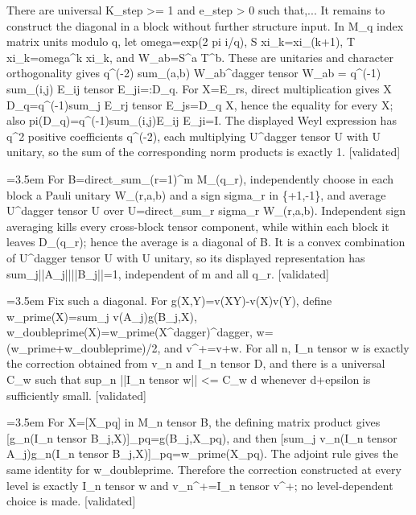 \documentclass{article}
\newcommand{\step}[1]{\par\noindent\hangindent=3.5em\hangafter=1%
  \makebox[3.5em][l]{\textbf{#1.}}}
\newcommand{\steptag}[1]{\hfill{\small\textsf{[#1]}}}
\begin{document}
\begin{proofbox}{There are universal K\_step >= 1 and e\_step > 0 such that,...}
It remains to construct the diagonal in a block without further structure input. In M\_q index matrix units modulo q, let omega=exp(2 pi i/q), S xi\_k=xi\_(k+1), T xi\_k=omega\textasciicircum{}k xi\_k, and W\_ab=S\textasciicircum{}a T\textasciicircum{}b. These are unitaries and character orthogonality gives
q\textasciicircum{}(-2) sum\_(a,b) W\_ab\textasciicircum{}dagger tensor W\_ab = q\textasciicircum{}(-1) sum\_(i,j) E\_ij tensor E\_ji=:D\_q.
For X=E\_rs, direct multiplication gives X D\_q=q\textasciicircum{}(-1)sum\_j E\_rj tensor E\_js=D\_q X, hence the equality for every X; also pi(D\_q)=q\textasciicircum{}(-1)sum\_(i,j)E\_ij E\_ji=I. The displayed Weyl expression has q\textasciicircum{}2 positive coefficients q\textasciicircum{}(-2), each multiplying U\textasciicircum{}dagger tensor U with U unitary, so the sum of the corresponding norm products is exactly 1. \steptag{validated} \\[4pt]
\step{1.1.2} For B=direct\_sum\_(r=1)\textasciicircum{}m M\_(q\_r), independently choose in each block a Pauli unitary W\_(r,a,b) and a sign sigma\_r in \{+1,-1\}, and average U\textasciicircum{}dagger tensor U over U=direct\_sum\_r sigma\_r W\_(r,a,b). Independent sign averaging kills every cross-block tensor component, while within each block it leaves D\_(q\_r); hence the average is a diagonal of B. It is a convex combination of U\textasciicircum{}dagger tensor U with U unitary, so its displayed representation has sum\_j||A\_j||||B\_j||=1, independent of m and all q\_r. \steptag{validated} \\[4pt]
\step{1.2} Fix such a diagonal. For g(X,Y)=v(XY)-v(X)v(Y), define w\_prime(X)=sum\_j v(A\_j)g(B\_j,X), w\_doubleprime(X)=w\_prime(X\textasciicircum{}dagger)\textasciicircum{}dagger, w=(w\_prime+w\_doubleprime)/2, and v\textasciicircum{}+=v+w. For all n, I\_n tensor w is exactly the correction obtained from v\_n and I\_n tensor D, and there is a universal C\_w such that sup\_n ||I\_n tensor w|| <= C\_w d whenever d+epsilon is sufficiently small. \steptag{validated} \\[6pt]
\step{1.2.1} For X=[X\_pq] in M\_n tensor B, the defining matrix product gives [g\_n(I\_n tensor B\_j,X)]\_pq=g(B\_j,X\_pq), and then [sum\_j v\_n(I\_n tensor A\_j)g\_n(I\_n tensor B\_j,X)]\_pq=w\_prime(X\_pq). The adjoint rule gives the same identity for w\_doubleprime. Therefore the correction constructed at every level is exactly I\_n tensor w and v\_n\textasciicircum{}+=I\_n tensor v\textasciicircum{}+; no level-dependent choice is made. \steptag{validated} \\[4pt]

\end{proofbox}
\end{document}
